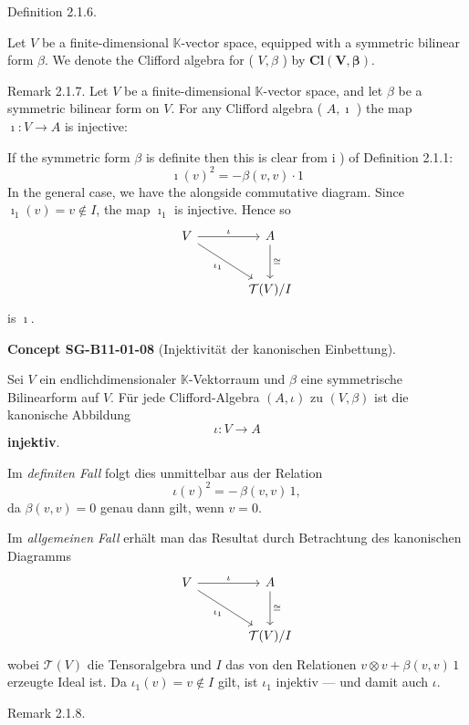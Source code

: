 \documentclass[10pt, letterpaper]{article}
\newcommand{\CustomHeading}[3]{%
  \par\medskip\noindent%
  \textbf{#1 #2} \textnormal{(#3)}.\enskip%
}
\newenvironment{CONC}[2]{\begin{unitbox}\CustomHeading{Concept}{#1}{#2}}{\end{unitbox}}
\begin{document}
Definition 2.1.6. 

Let $V$ be a finite-dimensional $\mathbb{K}$-vector space, equipped with a symmetric bilinear form $\beta$. We denote the Clifford algebra for ( $V, \beta$ ) by $\mathbf{C l}(\boldsymbol{V}, \boldsymbol{\beta})$.

Remark 2.1.7. Let $V$ be a finite-dimensional $\mathbb{K}$-vector space, and let $\beta$ be a symmetric bilinear form on $V$. For any Clifford algebra ( $A, \imath$ ) the map $\imath: V \rightarrow A$ is injective:

If the symmetric form $\beta$ is definite then this is clear from i ) of Definition 2.1.1:
$$
\imath(v)^{2}=-\beta(v, v) \cdot 1
$$
In the general case, we have the alongside commutative diagram. Since $\imath_{1}(v)=v \notin I$, the map $\imath_{1}$ is injective. Hence so
\[
\begin{tikzcd}[row sep=large, column sep=large]
V \arrow[r, "\iota"] \arrow[dr, "\iota_1"'] & A \arrow[d, "\cong"] \\
& \mathcal{T}(V)/I
\end{tikzcd}
\]
is $\imath$.



\begin{CONC}{SG-B11-01-08}{Injektivität der kanonischen Einbettung}
Sei $V$ ein endlichdimensionaler $\mathbb K$-Vektorraum und $\beta$ eine symmetrische Bilinearform auf $V$.
Für jede Clifford-Algebra $(A,\iota)$ zu $(V,\beta)$ ist die kanonische Abbildung
\[
\iota:V\longrightarrow A
\]
\textbf{injektiv}.

\smallskip
\noindent
Im \emph{definiten Fall} folgt dies unmittelbar aus der Relation
\[
\iota(v)^2=-\,\beta(v,v)\,1,
\]
da $\beta(v,v)=0$ genau dann gilt, wenn $v=0$.

\smallskip
\noindent
Im \emph{allgemeinen Fall} erhält man das Resultat durch Betrachtung des kanonischen Diagramms
\[
\begin{tikzcd}[row sep=large, column sep=large]
V \arrow[r, "\iota"] \arrow[dr, "\iota_1"'] & A \arrow[d, "\cong"] \\
& \mathcal{T}(V)/I
\end{tikzcd}
\]
wobei $\mathcal{T}(V)$ die Tensoralgebra und $I$ das von den Relationen
$v\otimes v + \beta(v,v)\,1$ erzeugte Ideal ist.
Da $\iota_1(v)=v\notin I$ gilt, ist $\iota_1$ injektiv — und damit auch $\iota$.
\end{CONC}


Remark 2.1.8. 
\end{document}
